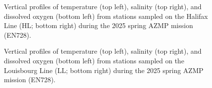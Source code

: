 \documentclass[12pt]{article}\usepackage[]{graphicx}\usepackage[]{color}
\begin{document}
\begin{appendices}
\begin{figure}[htb]
{}

\caption{Vertical profiles of temperature (top left), salinity (top right), and dissolved oxygen (bottom left) from stations sampled on the Halifax Line (HL; bottom right) during the 2025 spring AZMP mission (EN728).}\label{fig:figureA2}
\end{figure}
\clearpage
\begin{figure}[htb]

{\centering {} 

}

\caption{Vertical profiles of temperature (top left), salinity (top right), and dissolved oxygen (bottom left) from stations sampled on the Louisbourg Line (LL; bottom right) during the 2025 spring AZMP mission (EN728).}\label{fig:figureA3}
\end{figure}
\clearpage
\begin{figure}[htb]

{\centering {} 

}
\end{figure}
\end{appendices}
\end{document}
